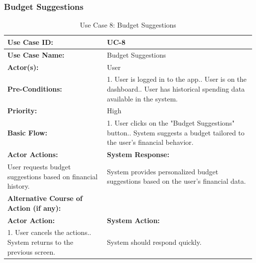 \documentclass[12pt]{article}
\begin{document}
\newpage
\vspace{1 cm} %
\noindent
\subsubsection{Budget Suggestions}
\vspace{0.5 cm}
    \begin{table}[H] %
    \centering
    \begin{tabular}{|p{4cm}|p{10cm}|}
        \hline
        \textbf{Use Case ID:} & UC-8 \\ \hline
        \textbf{Use Case Name:} & Budget Suggestions \\ \hline
        \textbf{Actor(s):} & User \\ \hline
        \textbf{Pre-Conditions:} & 
        1. User is logged in to the app.\newline
2. User is on the dashboard.\newline
3. User has historical spending data available in the system. \\ \hline
        \textbf{Priority:} & High \\ \hline
        \textbf{Basic Flow:} & 1. User clicks on the "Budget Suggestions" button.\newline
2. System suggests a budget tailored to the user’s financial behavior.\\ \hline
        \textbf{Actor Actions:} & \textbf{System Response:} \\ \hline
        User requests budget suggestions based on financial history.& System provides personalized budget suggestions based on the user’s financial data. \\ \hline
        \textbf{Alternative Course of Action (if any):} &  \\ \hline
        \textbf{Actor Action:} & \textbf{System Action:} \\ \hline
      1. User cancels the actions.\newline
2. System returns to the previous screen. & System should respond quickly.\\ \hline
     \end{tabular} 
     \caption{Use Case 8: Budget Suggestions}
\end{table}



\newpage
\vspace{1 cm} %
\noindent
\end{document}
